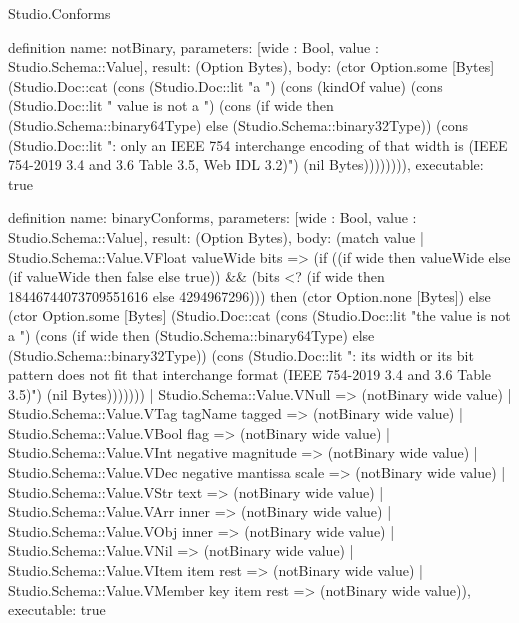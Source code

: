 \begin{lexlean}{Studio.Conforms}
\begin{semanticmodule}
definition{
  name: notBinary,
  parameters: [wide : Bool, value : Studio.Schema::Value],
  result: (Option Bytes),
  body: (ctor Option.some [Bytes] (Studio.Doc::cat (cons (Studio.Doc::lit "a ") (cons (kindOf value) (cons (Studio.Doc::lit " value is not a ") (cons (if wide then (Studio.Schema::binary64Type) else (Studio.Schema::binary32Type)) (cons (Studio.Doc::lit ": only an IEEE 754 interchange encoding of that width is (IEEE 754-2019 3.4 and 3.6 Table 3.5, Web IDL 3.2)") (nil Bytes)))))))),
  executable: true
}

definition{
  name: binaryConforms,
  parameters: [wide : Bool, value : Studio.Schema::Value],
  result: (Option Bytes),
  body: (match value
    | Studio.Schema::Value.VFloat valueWide bits => (if ((if wide then valueWide else (if valueWide then false else true)) && (bits <? (if wide then 18446744073709551616 else 4294967296))) then (ctor Option.none [Bytes]) else (ctor Option.some [Bytes] (Studio.Doc::cat (cons (Studio.Doc::lit "the value is not a ") (cons (if wide then (Studio.Schema::binary64Type) else (Studio.Schema::binary32Type)) (cons (Studio.Doc::lit ": its width or its bit pattern does not fit that interchange format (IEEE 754-2019 3.4 and 3.6 Table 3.5)") (nil Bytes)))))))
    | Studio.Schema::Value.VNull => (notBinary wide value)
    | Studio.Schema::Value.VTag tagName tagged => (notBinary wide value)
    | Studio.Schema::Value.VBool flag => (notBinary wide value)
    | Studio.Schema::Value.VInt negative magnitude => (notBinary wide value)
    | Studio.Schema::Value.VDec negative mantissa scale => (notBinary wide value)
    | Studio.Schema::Value.VStr text => (notBinary wide value)
    | Studio.Schema::Value.VArr inner => (notBinary wide value)
    | Studio.Schema::Value.VObj inner => (notBinary wide value)
    | Studio.Schema::Value.VNil => (notBinary wide value)
    | Studio.Schema::Value.VItem item rest => (notBinary wide value)
    | Studio.Schema::Value.VMember key item rest => (notBinary wide value)),
  executable: true
}

\end{semanticmodule}
\end{lexlean}
